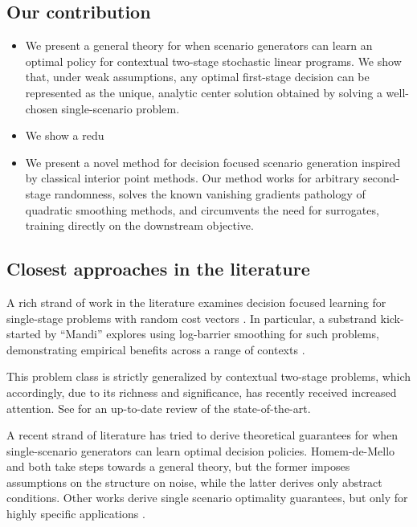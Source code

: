 \documentclass{article}
\theoremstyle{plain}
\theoremstyle{definition}
\theoremstyle{remark}
\begin{document}
\subsection{Our contribution}
\begin{itemize}
    \item We present a general theory for when scenario generators can learn an optimal
    policy for contextual two-stage stochastic linear programs.
    We show that, under weak assumptions, any optimal first-stage decision can be 
    represented as the unique, analytic center solution obtained by solving a 
    well-chosen single-scenario problem. 
    \item We show a redu
    \item We present a novel method for decision focused scenario generation inspired 
     by classical interior point methods. Our method works for arbitrary second-stage
     randomness, solves the known vanishing gradients pathology of quadratic smoothing methods, 
     and circumvents the need for surrogates, training directly on the downstream objective.
\end{itemize}
\label{sec:contributions}
%

\subsection{Closest approaches in the literature}
\label{sec:related-work}
A rich strand of work in the literature examines decision focused learning for single-stage problems with random cost vectors \cite{placeholder-single-stage-decfoc}. In particular, a substrand kick-started by ``Mandi'' \cite{mandi} explores using log-barrier smoothing for such problems, demonstrating empirical benefits across a range of contexts \cite{placeholder-barrier-benefits}.

This problem class is strictly generalized by contextual two-stage problems, which accordingly, due to its richness and significance, has recently received increased attention. See \cite{review-contextual-two-stage} for an up-to-date review of the state-of-the-art.

A recent strand of literature has tried to derive theoretical guarantees for when single-scenario generators can learn optimal decision policies. Homem-de-Mello and \cite{placeholder-abstract-conditions} both take steps towards a general theory, but the former imposes assumptions on the structure on noise, while the latter derives only abstract conditions. Other works derive single scenario optimality guarantees, but only for highly specific applications \cite{placeholder-specific-applications}.
\end{document}
